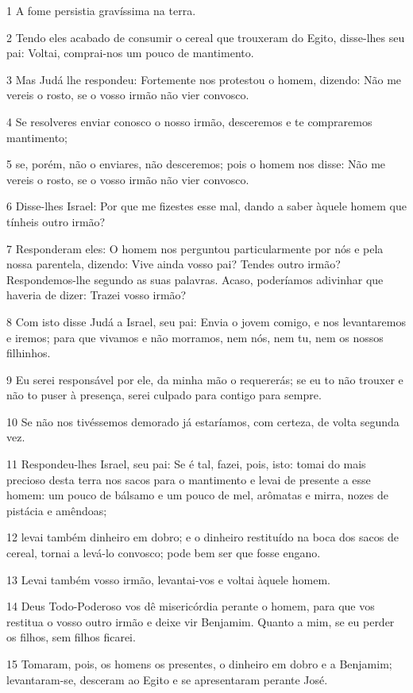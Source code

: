 \par 1 A fome persistia gravíssima na terra.
\par 2 Tendo eles acabado de consumir o cereal que trouxeram do Egito, disse-lhes seu pai: Voltai, comprai-nos um pouco de mantimento.
\par 3 Mas Judá lhe respondeu: Fortemente nos protestou o homem, dizendo: Não me vereis o rosto, se o vosso irmão não vier convosco.
\par 4 Se resolveres enviar conosco o nosso irmão, desceremos e te compraremos mantimento;
\par 5 se, porém, não o enviares, não desceremos; pois o homem nos disse: Não me vereis o rosto, se o vosso irmão não vier convosco.
\par 6 Disse-lhes Israel: Por que me fizestes esse mal, dando a saber àquele homem que tínheis outro irmão?
\par 7 Responderam eles: O homem nos perguntou particularmente por nós e pela nossa parentela, dizendo: Vive ainda vosso pai? Tendes outro irmão? Respondemos-lhe segundo as suas palavras. Acaso, poderíamos adivinhar que haveria de dizer: Trazei vosso irmão?
\par 8 Com isto disse Judá a Israel, seu pai: Envia o jovem comigo, e nos levantaremos e iremos; para que vivamos e não morramos, nem nós, nem tu, nem os nossos filhinhos.
\par 9 Eu serei responsável por ele, da minha mão o requererás; se eu to não trouxer e não to puser à presença, serei culpado para contigo para sempre.
\par 10 Se não nos tivéssemos demorado já estaríamos, com certeza, de volta segunda vez.
\par 11 Respondeu-lhes Israel, seu pai: Se é tal, fazei, pois, isto: tomai do mais precioso desta terra nos sacos para o mantimento e levai de presente a esse homem: um pouco de bálsamo e um pouco de mel, arômatas e mirra, nozes de pistácia e amêndoas;
\par 12 levai também dinheiro em dobro; e o dinheiro restituído na boca dos sacos de cereal, tornai a levá-lo convosco; pode bem ser que fosse engano.
\par 13 Levai também vosso irmão, levantai-vos e voltai àquele homem.
\par 14 Deus Todo-Poderoso vos dê misericórdia perante o homem, para que vos restitua o vosso outro irmão e deixe vir Benjamim. Quanto a mim, se eu perder os filhos, sem filhos ficarei.
\par 15 Tomaram, pois, os homens os presentes, o dinheiro em dobro e a Benjamim; levantaram-se, desceram ao Egito e se apresentaram perante José.
